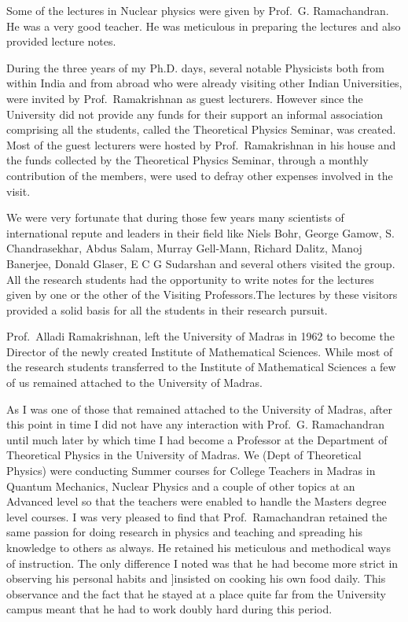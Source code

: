 Some of the lectures in Nuclear physics were given by Prof.\ G. Ramachandran. He was a very good teacher. He was meticulous in preparing the lectures and also provided lecture notes. 

During the three years of my Ph.D. days, several notable Physicists both from within India and from abroad who were already visiting other Indian Universities, were invited  by Prof.\ Ramakrishnan as guest lecturers. However since the University did not provide any funds for their support an informal association comprising all the students, called the Theoretical Physics Seminar, was created. Most of the guest lecturers were hosted by Prof.\ Ramakrishnan in his house and the funds collected by the Theoretical Physics Seminar, through a monthly contribution of the members,  were used to defray other expenses involved in the visit.

We were very fortunate that during those few years many scientists of international repute and leaders in their field like Niels Bohr, George Gamow, S. Chandrasekhar, Abdus Salam, Murray Gell-Mann, Richard Dalitz, Manoj Banerjee, Donald Glaser, E C G Sudarshan and several others visited the group. All the research students had  the opportunity to write notes for the lectures given by one or the other of the Visiting Professors.The lectures by these visitors provided a solid basis for all the students in their research pursuit. 

Prof.\ Alladi Ramakrishnan, left the University of Madras in 1962 to become  the Director of the newly created Institute of Mathematical Sciences. While most of the research students transferred to the Institute of Mathematical Sciences a few of us remained attached to the University of Madras.

As I was one of those that remained attached to the University of  Madras, after this point in time I did not have any interaction with Prof.\ G. Ramachandran until much later by which time I had become a Professor at the Department of Theoretical Physics in the University of Madras. We (Dept of Theoretical Physics) were conducting Summer courses for College Teachers in Madras in Quantum Mechanics, Nuclear Physics and a couple of other topics at an Advanced level so that the teachers were enabled to handle the Masters degree level courses. I was very pleased to find that Prof.\ Ramachandran retained the same passion for doing research in physics and teaching and spreading his knowledge to others as always. He retained his meticulous and methodical ways of instruction. The only difference I noted was that he had become more strict in observing his personal habits and ]insisted on cooking his own food daily. This observance and the fact that he stayed at a place quite far from the University campus meant that he had to work doubly hard during this period. 

